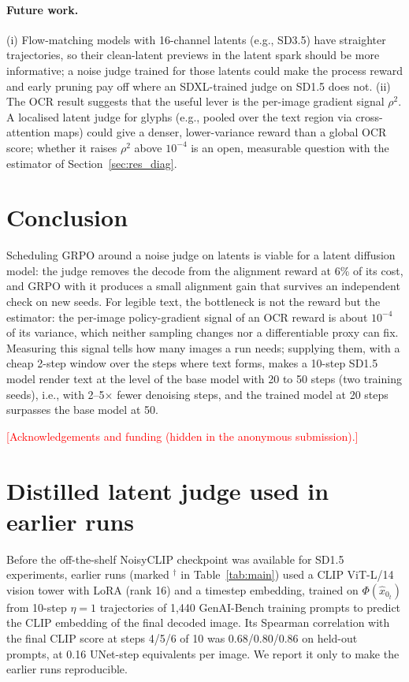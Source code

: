 \documentclass{article}
\newcommand{\tbd}[1]{\textcolor{red}{[#1]}}
\newcommand{\xhat}{\hat{x}_0}
\begin{document}
\paragraph{Future work.} (i) Flow-matching models with 16-channel latents (e.g., SD3.5) have straighter trajectories, so their
clean-latent previews in the latent spark should be more informative; a noise judge trained for those latents could make the
process reward and early pruning pay off where an SDXL-trained judge on SD1.5 does not. (ii) The OCR result suggests that the
useful lever is the per-image gradient signal $\rho^2$. A localised latent judge for glyphs (e.g., pooled over the text region
via cross-attention maps) could give a denser, lower-variance reward than a global OCR score; whether it raises $\rho^2$ above
$10^{-4}$ is an open, measurable question with the estimator of Section~\ref{sec:res_diag}.

\section{Conclusion}
\label{sec:conclusion}
Scheduling GRPO around a noise judge on latents is viable for a latent diffusion model: the judge removes the decode from the
alignment reward at 6\% of its cost, and GRPO with it produces a small alignment gain that survives an independent check on new
seeds. For legible text, the bottleneck is not the reward but the estimator: the per-image policy-gradient signal of an OCR
reward is about $10^{-4}$ of its variance, which neither sampling changes nor a differentiable proxy can fix. Measuring this
signal tells how many images a run needs; supplying them, with a cheap 2-step window over the steps where text forms, makes a
10-step SD1.5 model render text at the level of the base model with 20 to 50 steps (two training seeds), i.e., with 2--5$\times$
fewer denoising steps, and the trained model at 20 steps surpasses the base model at 50.

\begin{ack}
\tbd{Acknowledgements and funding (hidden in the anonymous submission).}
\end{ack}




\appendix

\section{Distilled latent judge used in earlier runs}
\label{app:distilled}
Before the off-the-shelf NoisyCLIP checkpoint was available for SD1.5 experiments, earlier runs (marked $^{\dagger}$ in
Table~\ref{tab:main}) used a CLIP ViT-L/14 vision tower with LoRA (rank 16) and a timestep embedding, trained on
$\Phi(\xhat_t)$ from 10-step $\eta=1$ trajectories of 1{,}440 GenAI-Bench training prompts to predict the CLIP embedding of the
final decoded image. Its Spearman correlation with the final CLIP score at steps 4/5/6 of 10 was 0.68/0.80/0.86 on held-out
prompts, at 0.16 UNet-step equivalents per image. We report it only to make the earlier runs reproducible.
\end{document}

